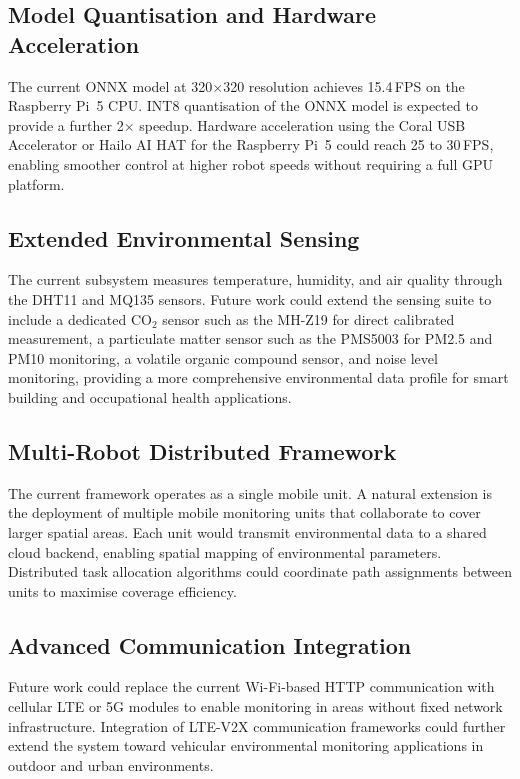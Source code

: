 \subsection{Model Quantisation and Hardware Acceleration}

The current ONNX model at 320$\times$320 resolution achieves 15.4\,FPS
on the Raspberry Pi~5 CPU. INT8 quantisation of the ONNX model is
expected to provide a further 2$\times$ speedup. Hardware acceleration
using the Coral USB Accelerator or Hailo AI HAT for the Raspberry Pi~5
could reach 25 to 30\,FPS, enabling smoother control at higher robot
speeds without requiring a full GPU platform.

\subsection{Extended Environmental Sensing}

The current subsystem measures temperature, humidity, and air quality
through the DHT11 and MQ135 sensors. Future work could extend the
sensing suite to include a dedicated CO$_2$ sensor such as the MH-Z19
for direct calibrated measurement, a particulate matter sensor such as
the PMS5003 for PM2.5 and PM10 monitoring, a volatile organic compound
sensor, and noise level monitoring, providing a more comprehensive
environmental data profile for smart building and occupational health
applications.

\subsection{Multi-Robot Distributed Framework}

The current framework operates as a single mobile unit. A natural
extension is the deployment of multiple mobile monitoring units that
collaborate to cover larger spatial areas. Each unit would transmit
environmental data to a shared cloud backend, enabling spatial mapping
of environmental parameters. Distributed task allocation algorithms
could coordinate path assignments between units to maximise coverage
efficiency.

\subsection{Advanced Communication Integration}

Future work could replace the current Wi-Fi-based HTTP communication
with cellular LTE or 5G modules to enable monitoring in areas without
fixed network infrastructure. Integration of LTE-V2X communication
frameworks could further extend the system toward vehicular
environmental monitoring applications in outdoor and urban environments.

